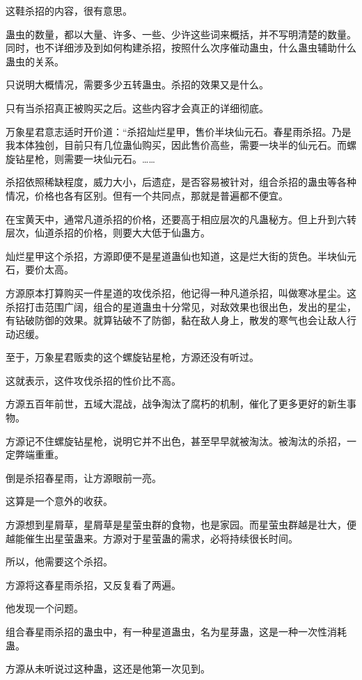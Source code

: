 \begin{this_body}
这鞋杀招的内容，很有意思。

蛊虫的数量，都以大量、许多、一些、少许这些词来概括，并不写明清楚的数量。同时，也不详细涉及到如何构建杀招，按照什么次序催动蛊虫，什么蛊虫辅助什么蛊虫的关系。

只说明大概情况，需要多少五转蛊虫。杀招的效果又是什么。

只有当杀招真正被购买之后。这些内容才会真正的详细彻底。

万象星君意志适时开价道：“杀招灿烂星甲，售价半块仙元石。春星雨杀招。乃是我本体独创，目前只有几位蛊仙购买，因此售价高些，需要一块半的仙元石。而螺旋钻星枪，则需要一块仙元石。……

杀招依照稀缺程度，威力大小，后遗症，是否容易被针对，组合杀招的蛊虫等各种情况，价格也各有区别。但有一个共同点，那就是普遍都不便宜。

在宝黄天中，通常凡道杀招的价格，还要高于相应层次的凡蛊秘方。但上升到六转层次，仙道杀招的价格，则要大大低于仙蛊方。

灿烂星甲这个杀招，方源即便不是星道蛊仙也知道，这是烂大街的货色。半块仙元石，要价太高。

方源原本打算购买一件星道的攻伐杀招，他记得一种凡道杀招，叫做寒冰星尘。这杀招打击范围广阔，组合的星道蛊虫十分常见，对敌效果也很出色，发出的星尘，有钻破防御的效果。就算钻破不了防御，黏在敌人身上，散发的寒气也会让敌人行动迟缓。

至于，万象星君贩卖的这个螺旋钻星枪，方源还没有听过。

这就表示，这件攻伐杀招的性价比不高。

方源五百年前世，五域大混战，战争淘汰了腐朽的机制，催化了更多更好的新生事物。

方源记不住螺旋钻星枪，说明它并不出色，甚至早早就被淘汰。被淘汰的杀招，一定弊端重重。

倒是杀招春星雨，让方源眼前一亮。

这算是一个意外的收获。

方源想到星屑草，星屑草是星萤虫群的食物，也是家园。而星萤虫群越是壮大，便越能催生出星萤蛊来。方源对于星萤蛊的需求，必将持续很长时间。

所以，他需要这个杀招。

方源将这春星雨杀招，又反复看了两遍。

他发现一个问题。

组合春星雨杀招的蛊虫中，有一种星道蛊虫，名为星芽蛊，这是一种一次性消耗蛊。

方源从未听说过这种蛊，这还是他第一次见到。


\end{this_body}
